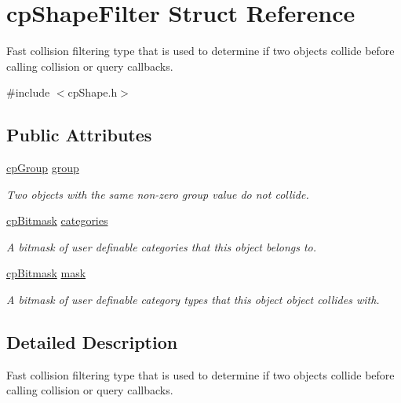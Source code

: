 \hypertarget{structcp_shape_filter}{}\section{cp\+Shape\+Filter Struct Reference}
\label{structcp_shape_filter}


Fast collision filtering type that is used to determine if two objects collide before calling collision or query callbacks.  




{\ttfamily \#include $<$cp\+Shape.\+h$>$}

\subsection*{Public Attributes}
\begin{DoxyCompactItemize}
\item 
\hyperlink{group__basic_types_gacd811b1135a8f4a3e5cc019552b18b1a}{cp\+Group} \hyperlink{structcp_shape_filter_a6d29bf3cc7f406cdf834465f9de71c21}{group}
\begin{DoxyCompactList}\small\item\em Two objects with the same non-\/zero group value do not collide. \end{DoxyCompactList}\item 
\hyperlink{group__basic_types_gae7ff94f62e00cae288c1991958822743}{cp\+Bitmask} \hyperlink{structcp_shape_filter_a916b2d61e3ea9d1e7d26a6bc59ac955b}{categories}
\begin{DoxyCompactList}\small\item\em A bitmask of user definable categories that this object belongs to. \end{DoxyCompactList}\item 
\hyperlink{group__basic_types_gae7ff94f62e00cae288c1991958822743}{cp\+Bitmask} \hyperlink{structcp_shape_filter_a0ee36d60cbc25e1abf18aa1508d7a537}{mask}
\begin{DoxyCompactList}\small\item\em A bitmask of user definable category types that this object object collides with. \end{DoxyCompactList}\end{DoxyCompactItemize}


\subsection{Detailed Description}
Fast collision filtering type that is used to determine if two objects collide before calling collision or query callbacks. 

